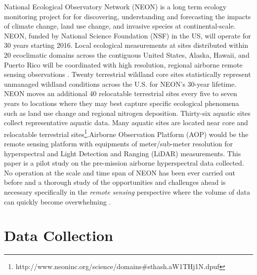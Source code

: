 \documentclass[remotesensing,article,accept,moreauthors,pdftex,12pt,a4paper]{mdpi}
\begin{document}
National Ecological Observatory Network (NEON) is a long term ecology monitoring project for for discovering, understanding and forecasting the impacts of climate change, land use change, and invasive species at continental-scale. NEON, funded by National Science Foundation (NSF) in the US, will operate for 30 years starting 2016. Local ecological measurements at sites distributed within 20 ecoclimatic domains across the contiguous United States, Alaska, Hawaii, and Puerto Rico will be coordinated with high resolution, regional airborne remote sensing observations \cite{kampe2010neon}. Twenty terrestrial wildland core sites statistically represent unmanaged wildland conditions across the U.S. for NEON's 30-year lifetime. NEON moves an additional 40 relocatable terrestrial sites every five to seven years to locations where they may best capture specific ecological phenomena such as land use change and regional nitrogen deposition. Thirty-six aquatic sites collect representative aquatic data. Many aquatic sites are located near core and relocatable terrestrial sites\footnote{http://www.neoninc.org/science/domains\#sthash.aW1THj1N.dpuf}.Airborne Observation Platform (AOP) would be the remote sensing platform with equipments of meter/sub-meter resolution for hyperspectral and Light Detection and Ranging (LiDAR) measurements. This paper is a pilot study on the pre-mission airborne hyperspectral data collected. No operation at the scale and time span of NEON has been ever carried out before and a thorough study of the opportunities and challenges ahead is necessary specifically in the \textit{remote sensing} perspective where the volume of data can quickly become overwhelming \cite{neon2010aopdatarelease}.

\section{Data Collection}
\end{document}
